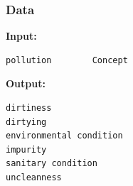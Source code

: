 \documentclass[10pt, compress]{beamer}
\begin{document}
\begin{frame}[fragile]
\frametitle{Data}

\textbf{Input:}
{\small
\begin{verbatim}
pollution        Concept
\end{verbatim}
}

\textbf{Output:}
{\small
\begin{verbatim}
dirtiness
dirtying
environmental condition
impurity
sanitary condition
uncleanness
\end{verbatim}
}

\end{frame}



\end{document}
